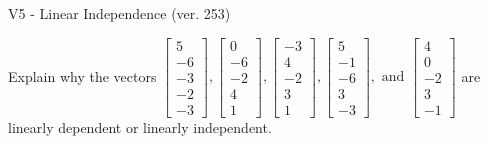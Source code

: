 \begin{exercise}
  \begin{exerciseTitle}V5 - Linear Independence (ver. 253)\end{exerciseTitle}
  \begin{exerciseStatement}
    Explain why the vectors \(\left[\begin{array}{r}
5 \\
-6 \\
-3 \\
-2 \\
-3
\end{array}\right] , \left[\begin{array}{r}
0 \\
-6 \\
-2 \\
4 \\
1
\end{array}\right] , \left[\begin{array}{r}
-3 \\
4 \\
-2 \\
3 \\
1
\end{array}\right] , \left[\begin{array}{r}
5 \\
-1 \\
-6 \\
3 \\
-3
\end{array}\right] , \text{ and } \left[\begin{array}{r}
4 \\
0 \\
-2 \\
3 \\
-1
\end{array}\right]\) are linearly dependent or linearly independent.	



\end{exerciseStatement}
\end{exercise}
